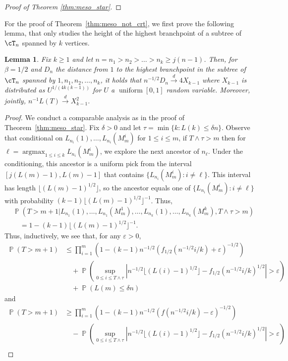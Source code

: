 \documentclass[letterpaper,11pt,reqno]{amsart}
\newtheorem{lem}[thm]{Lemma}
\theoremstyle{definition}
\renewcommand{\le}{\leqslant}
\renewcommand{\ge}{\geqslant}
\newcommand{\eps}{\varepsilon}
\DeclareMathOperator{\pr}{\mathds{P}}
\DeclareMathOperator{\argmax}{argmax}
\newcommand{\convd}{\stackrel{d}{\longrightarrow}}
\begin{document}
{\begin{proof}[Proof of Theorem \ref{thm:meso_star}]
\end{proof}
For the proof of Theorem~\ref{thm:meso_not_crt}, we first prove the following lemma, that only studies the height of the highest branchpoint of a subtree of $\cT_n$ spanned by $k$ vertices. 
\begin{lem}\label{lem:1st_step_ancestral}
Fix $k\ge 1$ and let $n=n_1>n_2>\dots> n_k\ge j(n-1)$. Then, for $\beta=1/2$ and $D_n$ the distance from $1$ to the highest branchpoint in the subtree of $\cT_n$ spanned by $1,n_1,n_2,\dots, n_k$, it holds that $n^{-1/2}D_n\convd 4X_{k-1}$ where $X_{k-1}$ is distributed as $U^{1/(4k(k-1))}$ for $U$ a $\operatorname{uniform}[0,1]$ random variable. Moreover, jointly, $n^{-1}L(T)\convd X_{k-1}^2$. \end{lem}
\begin{proof}
We conduct a comparable analysis as in the proof of Theorem~\ref{thm:meso_star}. Fix $\delta>0$ and let  $\tau=\min\{k:L(k)\le \delta n \}$. Observe that conditional on $L_{n_i}(1), \dots, L_{n_i}(M^i_{m})$ for $1\le i \le m$, if $T\wedge \tau >m$ then for $\ell=\argmax_{1\le i\le k}L_{n_i}(M^i_m)$, we explore the next ancestor of $n_\ell$. Under the conditioning, this ancestor is a uniform pick from the interval 
$[j(L(m)-1), L(m)-1]$ that contains $\{L_{n_i}(M^i_m):i\ne\ell\}$. This interval has length $\lfloor (L(m)-1)^{1/2} \rfloor$, so the ancestor equals one of $\{L_{n_i}(M^i_m):i\ne\ell\}$ with probability $(k-1)\lfloor (L(m)-1)^{1/2} \rfloor^{-1}$. Thus, 
\begin{align*}&\pr(T> m+1|
L_{n_1}(1), \dots, L_{n_1}(M^1_{m}), \dots, L_{n_k}(1), \dots, L_{n_k}(M^k_{m}),T\wedge \tau > m)\\&\quad = 1-(k-1)\lfloor (L(m)-1)^{1/2} \rfloor^{-1} .\end{align*}
Thus, inductively, we see that, for any $\varepsilon>0$, 
\begin{align*}\pr(T> m+1)&\le \prod_{i=1}^m \left(1-(k-1)n^{-1/2} (f_{1/2}(n^{-1/2} i/k)+\eps)^{-1/2}\right)\\
&\quad +\pr\left (\sup_{0\le i \le T\wedge\tau}\left|n^{-1/2}\lfloor (L(i)-1)^{1/2} \rfloor-f_{1/2}(n^{-1/2}i/k)^{1/2}\right|>\eps\right) \\
&\quad +\pr(L(m)\le \delta n)\end{align*}
and 
\begin{align*}\pr(T> m+1)&\ge \prod_{i=1}^m(1-(k-1)n^{-1/2} (f(n^{-1/2} i/k)-\eps)^{-1/2} )\\
&\quad -\pr\left (\sup_{0\le i \le T\wedge\tau}\left|n^{-1/2}\lfloor (L(i)-1)^{1/2} \rfloor-f_{1/2}(n^{-1/2}i/k)^{1/2}\right|>\eps\right) \\

\end{align*}
\end{proof}}
\end{document}
